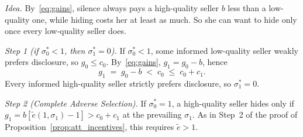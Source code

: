 \upshape
\emph{Idea.} By~\eqref{eq:gains}, silence always pays a high-quality seller $b$ less than a low-quality one, while hiding costs her at least as much. So she can want to hide only once every low-quality seller does.

\emph{Step 1 (if $\sigma_0^*<1$, then $\sigma_1^*=0$).} If $\sigma_0^*<1$, some informed low-quality seller weakly prefers disclosure, so $g_0\le c_0$. By~\eqref{eq:gains}, $g_1=g_0-b$, hence
\begin{equation*}
    g_1\;=\;g_0-b\;<\;c_0\;\le\;c_0+c_1.
\end{equation*}
Every informed high-quality seller strictly prefers disclosure, so $\sigma_1^*=0$.

\emph{Step 2 (Complete Adverse Selection).} If $\sigma_0^*=1$, a high-quality seller hides only if $g_1=b[\tilde e(1,\sigma_1)-1]>c_0+c_1$ at the prevailing $\sigma_1$. As in Step~2 of the proof of Proposition~\ref{prop:att_incentives}, this requires $\tilde e>1$.
